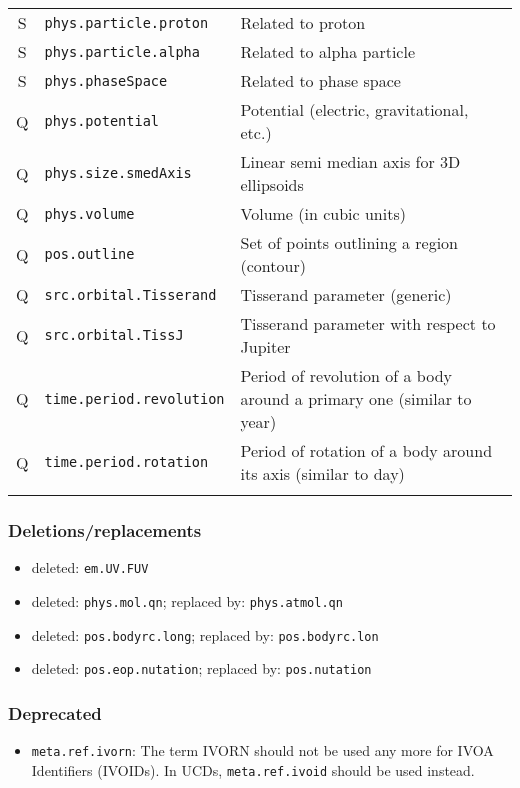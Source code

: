 \documentclass[11pt,a4paper]{ivoa}
\begin{document}
\begin{longtable}[h!]{c|p{40ex}|p{}}
S & {\tt phys.particle.proton} & Related to proton\\
S & {\tt phys.particle.alpha} & Related to alpha particle\\
S & {\tt phys.phaseSpace} & Related to phase space\\
Q & {\tt phys.potential} & Potential (electric, gravitational, etc.)\\
Q & {\tt phys.size.smedAxis} & Linear semi median axis for 3D ellipsoids\\
Q & {\tt phys.volume} & Volume (in cubic units)\\
Q & {\tt pos.outline} & Set of points outlining a region (contour)\\
Q & {\tt src.orbital.Tisserand} & Tisserand parameter (generic)\\
Q & {\tt src.orbital.TissJ} & Tisserand parameter with respect to Jupiter\\
Q & {\tt time.period.revolution} & Period of revolution of a body around a primary one (similar to year)\\
Q & {\tt time.period.rotation} & Period of rotation of a body around its axis (similar to day)\\
\sptablerule
\end{longtable}

\subsubsection*{Deletions/replacements}
\begin{itemize}
\item deleted: {\tt em.UV.FUV} 
\item deleted: {\tt phys.mol.qn}; replaced by: {\tt phys.atmol.qn}
\item deleted: {\tt pos.bodyrc.long}; replaced by: {\tt pos.bodyrc.lon}
\item deleted: {\tt pos.eop.nutation}; replaced by: {\tt pos.nutation}
\end{itemize}

\subsubsection*{Deprecated}
\begin{itemize}
\item {\tt meta.ref.ivorn}: The term IVORN should not be used any more for IVOA Identifiers (IVOIDs). 
In UCDs, {\tt meta.ref.ivoid} should be used instead.
\end{itemize} 
\end{document}
